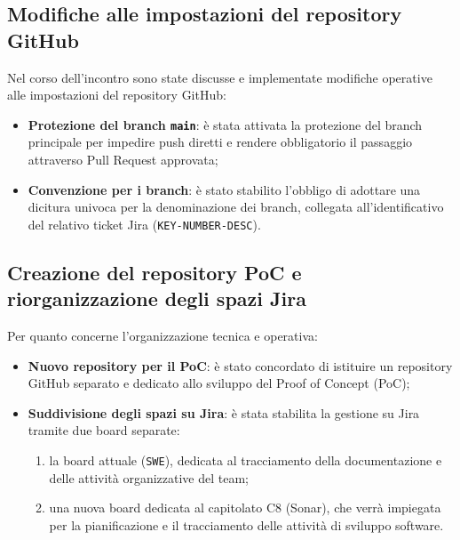 \subsection{Modifiche alle impostazioni del repository GitHub}
Nel corso dell'incontro sono state discusse e implementate modifiche operative alle impostazioni del repository GitHub:
\begin{itemize}
    \item \textbf{Protezione del branch \texttt{main}}: è stata attivata la protezione del branch principale per impedire push diretti e rendere obbligatorio il passaggio attraverso Pull Request approvata;
    \item \textbf{Convenzione per i branch}: è stato stabilito l'obbligo di adottare una dicitura univoca per la denominazione dei branch, collegata all'identificativo del relativo ticket Jira (\texttt{KEY-NUMBER-DESC}).
\end{itemize}

\subsection{Creazione del repository PoC e riorganizzazione degli spazi Jira}
Per quanto concerne l'organizzazione tecnica e operativa:
\begin{itemize}
    \item \textbf{Nuovo repository per il PoC}: è stato concordato di istituire un repository GitHub separato e dedicato allo sviluppo del Proof of Concept (PoC);
    \item \textbf{Suddivisione degli spazi su Jira}: è stata stabilita la gestione su Jira tramite due board separate:
    \begin{enumerate}
        \item la board attuale (\texttt{SWE}), dedicata al tracciamento della documentazione e delle attività organizzative del team;
        \item una nuova board dedicata al capitolato C8 (Sonar), che verrà impiegata per la pianificazione e il tracciamento delle attività di sviluppo software.
    \end{enumerate}
\end{itemize}

